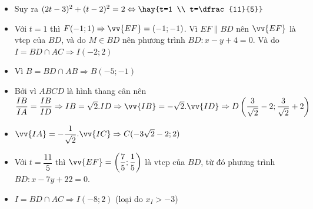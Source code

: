 \begin{itemize}[label=,leftmargin=*]
\item Suy ra $(2t-3)^2+(t-2)^2=2 \Leftrightarrow \hay{t=1 \\ t=\dfrac{11}{5}}$
\item Với $t=1$ thì $F(-1;1)\Rightarrow \vv{EF}=(-1;-1)$. Vì $EF\parallel BD$ nên $\vv{EF}$ là vtcp của $BD$, và do $M\in BD$ 
nên phương trình $BD: x-y+4=0$. Và do $I=BD\cap AC\Rightarrow I(-2;2)$
\item Vì $B=BD\cap AB\Rightarrow B(-5;-1)$
\item Bởi vì $ABCD$ là hình thang cân nên $\dfrac{IB}{IA}=\dfrac{IB}{ID}\Rightarrow IB=\sqrt{2}.ID\Rightarrow \vv{IB}=-\sqrt{2}.\vv{ID}
\Rightarrow D\left(\dfrac{3}{\sqrt{2}}-2;\dfrac{3}{\sqrt{2}}+2 \right)$
\item $\vv{IA}=-\dfrac{1}{\sqrt{2}}.\vv{IC}\Rightarrow C(-3\sqrt{2}-2;2)$
\item Với $t=\dfrac{11}{5}$ thì $\vv{EF}=\left(\dfrac{7}{5};\dfrac{1}{5} \right)$ là vtcp của $BD$, từ đó phương trình $BD:x-7y+22=0$.
\item $I=BD \cap AC\Rightarrow I(-8;2)$ (loại do $x_I>-3$)
\end{itemize}

